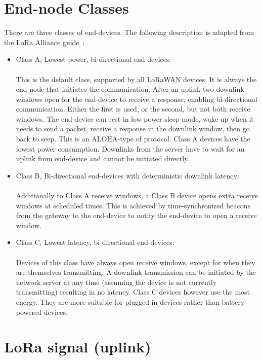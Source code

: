 \section{End-node Classes}
There are three classes of end-devices. The following description is adapted from the LoRa Alliance guide~\cite{about_lora_wan,what_is_lora}:
\begin{itemize}
    \item Class A, Lowest power, bi-directional end-devices:\\
    \\
    This is the default class, supported by all LoRaWAN devices.
    It is always the end-node that initiates the communication. After an uplink
    two downlink windows open for the end-device to receive a response, enabling bi-directional communication.
    Either the first is used, or the second, but not both receive windows.
    The end-device can rest in low-power sleep mode, wake up when it needs to send a packet, receive a response
    in the downlink window, then go back to seep. This is an ALOHA-type of protocol. Class A devices have the lowest 
    power consumption. Downlinks from the server have to wait for an uplink from end-device and cannot be initiated directly.
    \item Class B, Bi-directional end-devices with deterministic downlink latency:\\
    \\ 
    Additionally to Class A receive windows, a Class B device opens extra receive windows at scheduled times.
    This is achieved by time-synchronized beacons from the gateway to the end-device to notify the end-device
    to open a receive window.

    \item Class C, Lowest latency, bi-directional end-devices:\\
    \\
    Devices of this class have always open receive windows, except for when they are themselves transmitting.
    A downlink transmission can be initiated by the network server at any time (assuming the device is not currently transmitting)
    resulting in no latency. Class C devices however use the most energy. They are more suitable for plugged in devices rather than
    battery powered devices.

\end{itemize}

\section{LoRa signal (uplink)}

